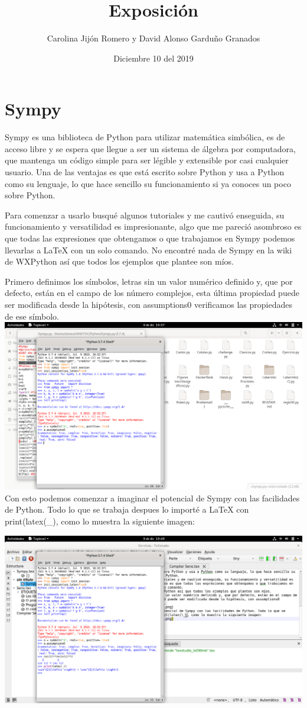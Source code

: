 \documentclass[]{article}
\title{Exposición}
\author{Carolina Jijón Romero
y David Alonso Garduño Granados}
\date{Diciembre 10 del 2019}
\begin{document}
\maketitle

\section{Sympy}
Sympy es una biblioteca de Python para utilizar matemática simbólica, es de acceso libre y se espera que llegue a ser un sistema de álgebra por computadora, que mantenga un código simple para ser légible y extensible por casi cualquier usuario.
Una de las ventajas es que está escrito sobre Python y usa a Python como su lenguaje, lo que hace sencillo su funcionamiento si ya conoces un poco sobre Python.

Para comenzar a usarlo busqué algunos tutoriales y me cautivó enseguida, su funcionamiento y versatilidad es impresionante, algo que me pareció asombroso es que todas las expresiones que obtengamos o que trabajamos en Sympy podemos llevarlas a LaTeX con un solo comando.
No encontré nada de Sympy en la wiki de WXPython así que todos los ejemplos que plantee son míos.

Primero definimos los símbolos, letras sin un valor numérico definido y, que por defecto, están en el campo de los número complejos, esta última propiedad puede ser modificada desde la hipótesis, con assumptions0 verificamos las propiedades de ese símbolo.
\vfill
\includegraphics[scale=0.20]{Imagenes/SPY1.png}
\vfill
Con esto podemos comenzar a imaginar el potencial de Sympy con las facilidades de Python. Todo lo que se trabaja despues lo importé a LaTeX con print(latex(\_), como lo muestra la siguiente imagen:

\includegraphics[scale=0.20]{Imagenes/SPY2.png}
\end{document}
